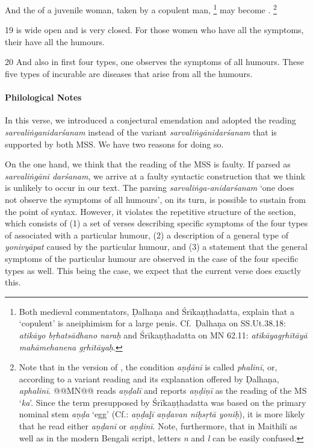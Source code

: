 \begin{translation}
And the  of a juvenile woman, taken by a copulent man,%
\footnote{%
Both medieval commentators, Ḍalhaṇa and Śrīkaṇṭhadatta, explain that a 
‘copulent’ is aneiphimism for a large penis. Cf.\ Ḍalhaṇa on SS.Ut.38.18: 
\textit{atikāyo bṛhatsādhano naraḥ} and Śrīkaṇṭhadatta on MN 62.11: 
\textit{atikāyagṛhītāyā mahāmehanena gṛhītāyaḥ}.%
} 
may become .%
\footnote{%
Note that in the version of \cite{vulgate}, the condition \textit{aṇḍānī} is called 
\textit{phalinī}, or, according to a variant reading and its explanation offered by 
Ḍalhaṇa, \textit{aphalinī}.
@@MN@@ reads \textit{aṇḍalī} and reports \textit{aṇḍiṇī} as the reading of the 
MS `\textit{ka}'. Since the term presupposed by Śrīkaṇṭhadatta was based on the 
primary nominal stem \textit{aṇḍa} ‘egg’ (Cf.: \textit{aṇḍa\underline{l}ī aṇḍavan 
niḥsṛtā yoniḥ}), it is more likely that he read either \textit{aṇḍanī} or 
\textit{aṇḍinī}. Note, furthermore, that in Maithilī as well as in the modern Bengali 
script, letters \textit{n} and \textit{l} can be easily confused.
}

\item [19]
 is wide open and  is very closed.
For those women who have all the symptoms,%
their  have all the humours.

\item [20]
And also in first four types, one observes the symptoms of all humours.%
These five types of incurable  are 
diseases that arise from all the humours.
\end{translation}

\paragraph*{Philological Notes}
In this verse, we introduced a conjectural emendation and adopted the reading 
\textit{sarvaliṅganidarśanam} instead of the variant 
\textit{sarvaliṅgānidarśanam} that is supported by both MSS. We have two 
reasons for doing so. 

On the one hand, we think that the reading of the MSS is faulty. If parsed as 
\textit{sarvaliṅgāni darśanam}, we arrive at a faulty syntactic construction that 
we think is unlikely to occur in our text. The parsing 
\textit{sarvaliṅga-anidarśanam} ‘one does not observe the symptoms of all 
humours’, on its turn, is possible to sustain from the point of syntax. However, it 
violates the repetitive structure of the section, which consists of (1) a set of verses 
describing specific symptoms of the four types of  associated 
with a particular humour, (2) a description of a general type of 
\textit{yonivyāpat}{} caused by the particular humour, and (3) a statement that 
the general symptoms of the particular humour are observed in the case of the 
four specific types as well. This being the case, we expect that the current verse 
does exactly this.

